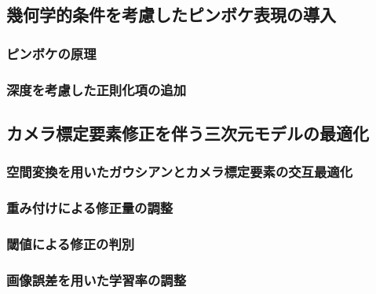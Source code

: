 \subsection{幾何学的条件を考慮したピンボケ表現の導入}\label{subsec:introduction_of_blur_expression}
\subsubsection{ピンボケの原理}\label{subsubsec:principle_of_blur}
\subsubsection{深度を考慮した正則化項の追加}\label{subsubsec:add_regularization_term}
\subsection{カメラ標定要素修正を伴う三次元モデルの最適化}\label{subsec:pose_correction}
\subsubsection{空間変換を用いたガウシアンとカメラ標定要素の交互最適化}\label{subsubsec:sequential_optimization}
\subsubsection{重み付けによる修正量の調整}
\subsubsection*{閾値による修正の判別}
\subsubsection*{画像誤差を用いた学習率の調整}
\cite{3d_warping}